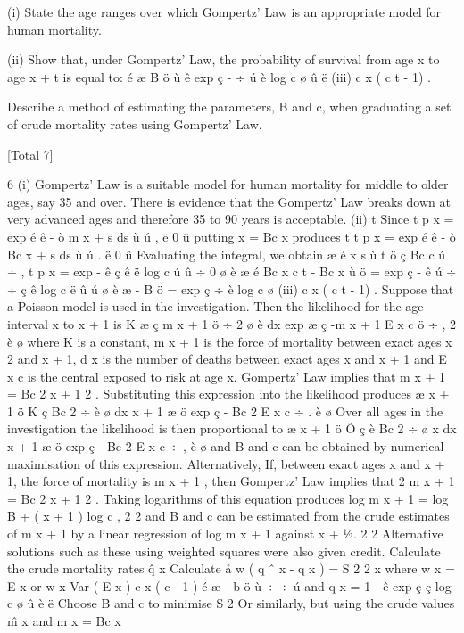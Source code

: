 \documentclass[a4paper,12pt]{article}
\begin{document}
(i) State the age ranges over which Gompertz’ Law is an appropriate model for
human mortality.

(ii) Show that, under Gompertz’ Law, the probability of survival from age x to age
x + t is equal to:
é
æ
B ö ù
ê exp ç -
÷ ú
è log c ø û
ë
(iii)
c x ( c t - 1)
.

Describe a method of estimating the parameters, B and c, when graduating a
set of crude mortality rates using Gompertz’ Law.

[Total 7]

6
(i)
Gompertz’ Law is a suitable model for human mortality for middle to older
ages, say 35 and over.
There is evidence that the Gompertz’ Law breaks down at very advanced ages
and therefore 35 to 90 years is acceptable.
(ii)
t
Since t p x = exp é ê - ò m x + s ds ù ú ,
ë 0
û
putting \mu x = Bc x produces
t
t
p x = exp é ê - ò Bc x + s ds ù ú .
ë 0
û
Evaluating the integral, we obtain
æ é x s ù t ö
ç Bc c ú ÷ ,
t p x = exp - ê
ç ê ë log c ú û ÷
0 ø
è
æ é Bc x c t - Bc x ù ö
= exp ç - ê
ú ÷ ÷
ç ê
log
c
ë
û ú ø
è
æ - B ö
= exp ç
÷
è log c ø
(iii)
c x ( c t - 1)
.
Suppose that a Poisson model is used in the investigation.
Then the likelihood for the age interval x to x + 1 is
K æ ç m x + 1 ö ÷
2 ø
è
dx
exp æ ç -m x + 1 E x c ö ÷ ,
2
è
ø
where K is a constant, m x + 1 is the force of mortality between exact ages x
2
and x + 1, d x is the number of deaths between exact ages x and x + 1 and E x c is
the central exposed to risk at age x.
Gompertz’ Law implies that m x + 1 = Bc
2
x + 1
2 .
Substituting this expression into the likelihood produces
æ x + 1 ö
K ç Bc 2 ÷
è
ø
dx
x + 1
æ
ö
exp ç - Bc 2 E x c ÷ .
è
ø
Over all ages in the investigation the likelihood is then proportional to
æ x + 1 ö
Õ ç è Bc 2 ÷ ø
x
dx
x + 1
æ
ö
exp ç - Bc 2 E x c ÷ ,
è
ø
and B and c can be obtained by numerical maximisation of this expression.
Alternatively,
If, between exact ages x and x + 1, the force of mortality is
m x + 1 , then Gompertz’ Law implies that
2
m x + 1 = Bc
2
x + 1
2 .
Taking logarithms of this equation produces
log m x + 1 = log B + ( x + 1 ) log c ,
2
2
and B and c can be estimated from the crude estimates
of m x + 1 by a linear regression of log m x + 1 against x + 1⁄2.
2
2
Alternative solutions such as these using weighted squares were also given credit.
Calculate the crude mortality rates q̂ x
Calculate
å w ( q ˆ
x
- q x ) = S 2
2
x
where w x = E x or w x 
Var ( E x )
c x ( c - 1 )
é æ - b ö ù
÷ ÷ ú
and q x = 1 - ê exp ç ç
log
c
ø û
è
ë
Choose B and c to minimise S 2
Or similarly, but using the crude values m̂ x and m x = Bc x
\end{document}
